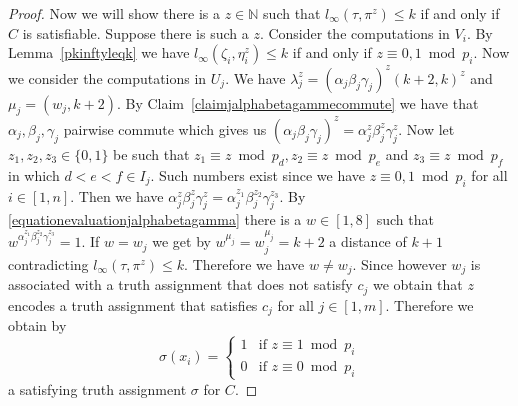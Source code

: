 \documentclass{article}
\begin{document}
\begin{proof}
Now we will show there is a $z \in \mathbb{N}$ such that $l_\infty(\tau,\pi^z) \leq k$ if and only if $C$ is satisfiable. Suppose there is such a $z$. Consider the computations in $V_i$. By Lemma~\ref{pkinftyleqk} we have $l_\infty(\zeta_i,\eta_i^z) \leq k$ if and only if $z \equiv 0,1 \bmod p_i$. Now we consider the computations in $U_j$. We have $\lambda_j^z = (\alpha_j\beta_j\gamma_j)^z(k+2,k)^z$ and $\mu_j = (w_j,k+2)$. By Claim~\ref{claimjalphabetagammecommute} we have that $\alpha_j,\beta_j,\gamma_j$ pairwise commute which gives us $(\alpha_j\beta_j\gamma_j)^z = \alpha_j^z\beta_j^z\gamma_j^z$. Now let $z_1,z_2,z_3 \in \{0,1\}$ be such that $z_1 \equiv z \bmod p_d, z_2 \equiv z \bmod p_e$ and $z_3 \equiv z \bmod p_f$ in which $d < e < f \in I_j$. Such numbers exist since we have $z \equiv 0,1 \bmod p_i$ for all $i \in [1,n]$. Then we have $\alpha_j^z\beta_j^z\gamma_j^z = \alpha_j^{z_1}\beta_j^{z_2}\gamma_j^{z_3}$. By \eqref{equationevaluationjalphabetagamma} there is a $w \in [1,8]$ such that $w^{\alpha_j^{z_1}\beta_j^{z_2}\gamma_j^{z_3}} = 1$. If $w=w_j$ we get by $w^{\mu_j} = w_j^{\mu_j} = k+2$ a distance of $k+1$ contradicting $l_\infty(\tau,\pi^z) \leq k$. Therefore we have $w \neq w_j$. Since however $w_j$ is associated with a truth assignment that does not satisfy $c_j$ we obtain that $z$ encodes a truth assignment that satisfies $c_j$ for all $j \in [1,m]$. Therefore we obtain by
\begin{displaymath}
\sigma(x_i) = \begin{cases}
1 & \text{if } z \equiv 1 \bmod p_i\\
0 & \text{if } z \equiv 0 \bmod p_i
\end{cases}
\end{displaymath}
a satisfying truth assignment $\sigma$ for $C$.


\end{proof}
\end{document}
